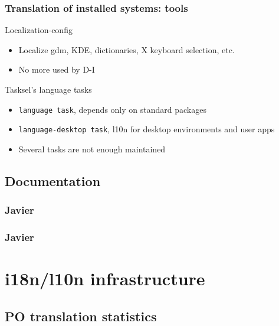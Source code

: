 \documentclass{beamer}
\begin{document}
\begin{frame}
  \frametitle{Translation of installed systems: tools}
	\begin{block}
		{Localization-config}
		\begin{itemize}
		\item
			Localize gdm, KDE, dictionaries, X keyboard selection, etc.
		\item
			No more used by D-I
		\end{itemize}
	\end{block}
	\begin{block}
		{Tasksel's language tasks}
		\begin{itemize}
		\item
			{\texttt{language task}}, depends only on standard packages
		\item
			{\texttt{language-desktop task}}, l10n for desktop environments and user apps
		\item
			{Several tasks are not enough maintained}
		\end{itemize}
	\end{block}
\end{frame}


\subsection{Documentation}

\begin{frame}
  \frametitle{Javier}
\end{frame}

\begin{frame}
  \frametitle{Javier}
\end{frame}


\section{i18n/l10n infrastructure}

\subsection{PO translation statistics}
\end{document}
